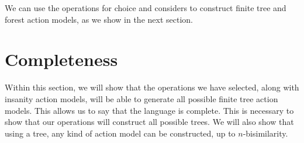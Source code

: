 We can use the operations for choice and considers to construct finite tree and
forest action models, as we show in the next section.

\section{Completeness} \label{subsec:multi:completeness}

Within this section, we will show that the operations we have selected, along
with insanity action
models, will be able to generate all possible finite tree action models.
This allows us to say that the language is complete.
This is necessary to show that our operations will construct all possible trees.
We will also show that using a tree, any kind of action model can be constructed, up to $n$-bisimilarity.

